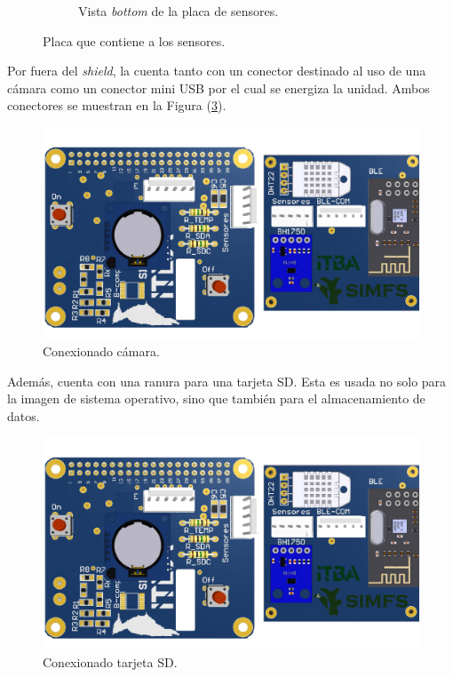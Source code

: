 \begin{figure}[H]
\begin{subfigure}{0.48\textwidth}
  		\caption{Vista \textit{bottom} de la placa de sensores.}
  		\label{fig:sensores_bottom}
    \end{subfigure}
	\caption{Placa que contiene a los sensores.}
	\label{fig:sensores_placa}
\end{figure}

Por fuera del \textit{shield}, la \rspi cuenta tanto con un conector destinado al uso de una cámara como un conector mini USB por el cual se energiza la unidad. Ambos conectores se muestran en la Figura (\ref{fig:rpiFront}).
\begin{figure}[H]
	\centering
	\includegraphics[width=\linewidth,page=3]{ImagenesIngenieria de Detalle/RPI}		
	\caption{Conexionado cámara.}
	\label{fig:rpiFront}
\end{figure}

Además, cuenta con una ranura para una tarjeta SD. Esta es usada no solo para la imagen de sistema operativo, sino que también para el almacenamiento de datos.
\begin{figure}[H]
	\centering
	\includegraphics[width=0.9\linewidth,page=2]{ImagenesIngenieria de Detalle/RPI}		
	\caption{Conexionado tarjeta SD.}
	\label{fig:rpiBack}
\end{figure}
